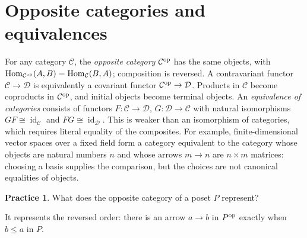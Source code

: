 \documentclass[11pt,openany]{book}
\newcommand{\id}{\operatorname{id}}\newcommand{\Sym}{\operatorname{Sym}}
\newcommand{\Hom}{\operatorname{Hom}}\newcommand{\Aut}{\operatorname{Aut}}
\theoremstyle{definition}
\newtheorem{exercise}[theorem]{Practice}
\begin{document}
\section{Opposite categories and equivalences}
For any category $\mathcal C$, the \emph{opposite category} $\mathcal C^{\rm op}$ has the same objects, with $\Hom_{\mathcal C^{\rm op}}(A,B)=\Hom_{\mathcal C}(B,A)$; composition is reversed. A contravariant functor $\mathcal C\to\mathcal D$ is equivalently a covariant functor $\mathcal C^{\rm op}\to\mathcal D$. Products in $\mathcal C$ become coproducts in $\mathcal C^{\rm op}$, and initial objects become terminal objects.
An \emph{equivalence of categories} consists of functors $F:\mathcal C\to\mathcal D$, $G:\mathcal D\to\mathcal C$ with natural isomorphisms $GF\cong\id_{\mathcal C}$ and $FG\cong\id_{\mathcal D}$. This is weaker than an isomorphism of categories, which requires literal equality of the composites. For example, finite-dimensional vector spaces over a fixed field form a category equivalent to the category whose objects are natural numbers $n$ and whose arrows $m\to n$ are $n\times m$ matrices: choosing a basis supplies the comparison, but the choices are not canonical equalities of objects.
\begin{exercise}What does the opposite category of a poset $P$ represent?\end{exercise}
\begin{solution}It represents the reversed order: there is an arrow $a\to b$ in $P^{\rm op}$ exactly when $b\le a$ in $P$.\end{solution}
\end{document}
